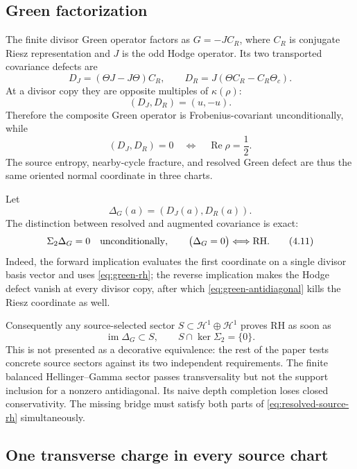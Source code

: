\documentclass[11pt]{article}
\theoremstyle{definition}
\theoremstyle{remark}
\newcommand{\cH}{\mathcal H}
\newcommand{\Rea}{\operatorname{Re}}
\newcommand{\im}{\operatorname{im}}
\begin{document}
\subsection{Green factorization}

The finite divisor Green operator factors as \(G=-JC_R\), where \(C_R\)
is conjugate Riesz representation and \(J\) is the odd Hodge operator.
Its two transported covariance defects are
\[
 D_J=(\Theta J-J\Theta)C_R,\qquad
 D_R=J(\Theta C_R-C_R\Theta_c).
\tag{4.7}\label{eq:green-defects}
\]
At a divisor copy they are opposite multiples of \(\kappa(\rho)\):
\[
                         (D_J,D_R)=(u,-u).
\tag{4.8}\label{eq:green-antidiagonal}
\]
Therefore the composite Green operator is Frobenius-covariant
unconditionally, while
\[
 (D_J,D_R)=0
 \quad\Longleftrightarrow\quad
 \Rea\rho=\frac12.
\tag{4.9}\label{eq:green-rh}
\]
The source entropy, nearby-cycle fracture, and resolved Green defect are
thus the same oriented normal coordinate in three charts.

Let
\[
                     \Delta_G(a)=(D_J(a),D_R(a)).
\tag{4.10}\label{eq:resolved-green-map}
\]
The distinction between resolved and augmented covariance is exact:
\[
 \Sigma_2\Delta_G=0\quad\hbox{unconditionally},
 \qquad
 \bigl(\Delta_G=0\bigr)\Longleftrightarrow\mathrm{RH}.
\tag{4.11}\label{eq:resolved-green-rh}
\]
Indeed, the forward implication evaluates the first coordinate on a
single divisor basis vector and uses \eqref{eq:green-rh}; the reverse
implication makes the Hodge defect vanish at every divisor copy, after
which \eqref{eq:green-antidiagonal} kills the Riesz coordinate as well.

Consequently any source-selected sector
\(S\subset\cH^1\oplus\cH^1\) proves RH as soon as
\[
       \im\Delta_G\subset S,
       \qquad S\cap\ker\Sigma_2=\{0\}.
\tag{4.12}\label{eq:resolved-source-rh}
\]
This is not presented as a decorative equivalence: the rest of the paper
tests concrete source sectors against its two independent requirements.
The finite balanced Hellinger--Gamma sector passes transversality but not
the support inclusion for a nonzero antidiagonal.  Its naive depth
completion loses closed conservativity.  The missing bridge must satisfy
both parts of \eqref{eq:resolved-source-rh} simultaneously.

\subsection{One transverse charge in every source chart}
\end{document}
